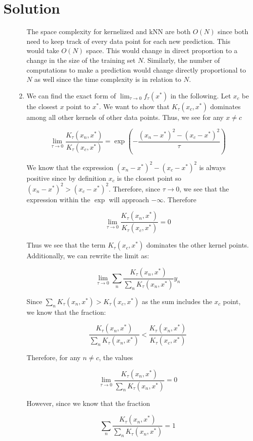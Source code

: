 \documentclass[submit]{../harvardml}
\newenvironment{solution}
  {\color{blue}\section*{Solution}}
{}
\begin{document}
\begin{solution}
\begin{enumerate}
\begin{enumerate}
            The space complexity for kernelized and kNN are both $O(N)$ since both need to keep track of every data point for each new prediction. This would take $O(N)$ space. This would change in direct proportion to a change in the size of the training set $N$. Similarly, the number of computations to make a prediction would change directly proportional to $N$ as well since the time complexity is in relation to $N$.
            
            \item We can find the exact form of $\lim_{\tau \to 0}f_\tau(x^*)$ in the following. Let $x_c$ be the closest $x$ point to $x^*$. We want to show that $K_\tau(x_c,x^*)$ dominates among all other kernels of other data points. Thus, we see for any $x \neq c$

            \[
            \lim_{\tau \to 0} \frac{K_\tau(x_n, x^*)}{K_\tau (x_c,x^*)} = \exp\left( - \frac{(x_n - x^*)^2 - (x_c-x^*)^2}{\tau} \right)
            \]

            We know that the expression $(x_n - x^*)^2 - (x_c-x^*)^2$ is always positive since by definition $x_c$ is the closest point so $(x_n - x^*)^2 > (x_c-x^*)^2$. Therefore, since $\tau \to 0$, we see that the expression within the $\exp$ will approach $-\infty$. Therefore

            \[
            \lim_{\tau \to 0} \frac{K_\tau(x_n, x^*)}{K_\tau (x_c,x^*)} = 0
            \]

            Thus we see that the term $K_\tau(x_c,x^*)$ dominates the other kernel points. Additionally, we can rewrite the limit as:

            \[
            \lim_{\tau \to 0}\sum_{n} \frac{K_\tau (x_n,x^*)}{\sum_{n}K_\tau (x_n,x^*)}y_n
            \]

            Since $\sum_{n}K_\tau (x_n,x^*) > K_\tau (x_c,x^*)$ as the sum includes the $x_c$ point, we know that the fraction:

            \[
            \frac{K_\tau (x_n,x^*)}{\sum_{n}K_\tau (x_n,x^*)} < \frac{K_\tau(x_n, x^*)}{K_\tau (x_c,x^*)}
            \]

            Therefore, for any $n \neq c$, the values

            \[
            \lim_{\tau\to 0}\frac{K_\tau(x_n,x^*)}{\sum_{n}K_\tau (x_n,x^*)} = 0
            \]

            However, since we know that the fraction

            \[
            \sum_{n} \frac{K_\tau (x_n,x^*)}{\sum_{n}K_\tau (x_n,x^*)} = 1
            \]


\end{enumerate}
\end{enumerate}
\end{solution}
\end{document}
